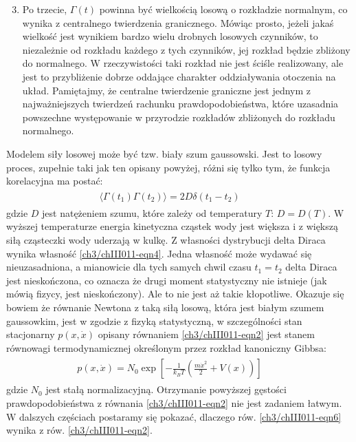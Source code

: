 \documentclass[a4paper,12pt,polish]{sphinxmanual}
\begin{document}
\begin{enumerate}
\setcounter{enumi}{2}
\item {} 
Po trzecie, $\Gamma(t)$ powinna być wielkością losową o rozkładzie normalnym, co wynika z centralnego twierdzenia granicznego. Mówiąc prosto, jeżeli jakaś wielkość jest wynikiem bardzo wielu drobnych losowych czynników, to niezależnie od rozkładu każdego z tych czynników, jej rozkład będzie zbliżony do normalnego. W rzeczywistości taki rozkład nie jest ściśle realizowany, ale jest to przybliżenie dobrze oddające charakter oddziaływania otoczenia na układ. Pamiętajmy, że centralne twierdzenie graniczne jest jednym z najważniejszych twierdzeń rachunku prawdopodobieństwa, które uzasadnia powszechne występowanie w przyrodzie rozkładów zbliżonych do rozkładu normalnego.

\end{enumerate}

Modelem siły losowej może być tzw. biały szum gaussowski. Jest to losowy proces, zupełnie taki jak ten opisany powyżej, różni się tylko tym, że funkcja korelacyjna ma postać:
\label{ch3/chIII011:equation-eqn5}\begin{gather}
\begin{split} \langle \Gamma(t_1) \Gamma(t_2)\rangle = 2D \delta(t_1 - t_2) \qquad\end{split}\label{ch3/chIII011-eqn5}
\end{gather}
gdzie $D$ jest natężeniem szumu, które zależy od temperatury $T$: $D = D(T)$. W wyższej temperaturze energia kinetyczna cząstek wody jest większa i z większą siłą cząsteczki wody uderzają w kulkę. Z własności dystrybucji delta Diraca wynika własność \eqref{ch3/chIII011-eqn4}. Jedna własność może wydawać się nieuzasadniona, a mianowicie dla tych samych chwil czasu $t_1 = t_2$ delta Diraca jest nieskończona, co oznacza że drugi moment statystyczny nie istnieje (jak mówią fizycy, jest nieskończony). Ale to nie jest aż takie kłopotliwe. Okazuje się bowiem że równanie Newtona z taką siłą losową, która jest białym szumem gaussowkim, jest w zgodzie z fizyką statystyczną, w szczególności stan stacjonarny $p(x, \dot x)$ opisany równaniem \eqref{ch3/chIII011-eqn2} jest stanem równowagi termodynamicznej określonym przez rozkład kanoniczny Gibbsa:
\label{ch3/chIII011:equation-eqn6}\begin{gather}
\begin{split} p(x, \dot x) = N_0 \exp\left[ - \frac{1}{k_B T}\left(\frac{m\dot x^2}{2} + V(x)\right)\right] \qquad\end{split}\label{ch3/chIII011-eqn6}
\end{gather}
gdzie $N_0$ jest stałą normalizacyjną. Otrzymanie powyższej gęstości prawdopodobieństwa z równania \eqref{ch3/chIII011-eqn2} nie jest zadaniem łatwym. W dalszych częściach postaramy się pokazać, dlaczego rów. \eqref{ch3/chIII011-eqn6} wynika z rów. \eqref{ch3/chIII011-eqn2}.
\end{document}
